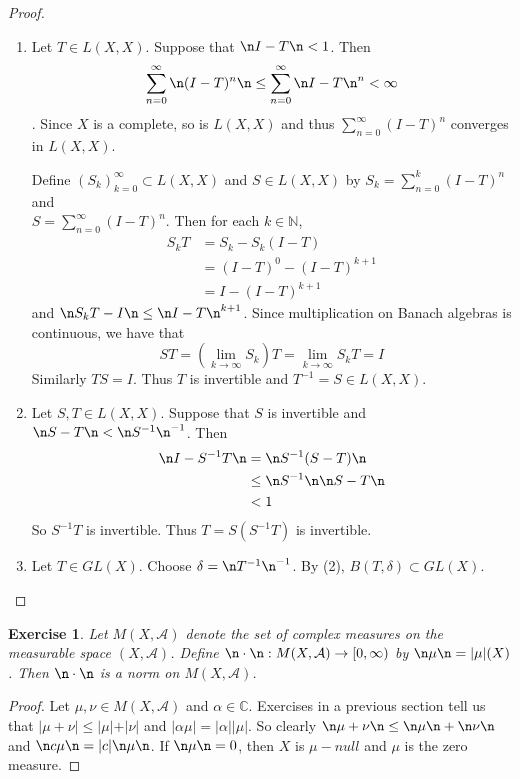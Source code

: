 \documentclass[12pt]{amsart}
\newtheorem{ex}[thm]{Exercise}
\newcommand{\al}{\alpha}
\newcommand{\del}{\delta}
\newcommand{\C}{\mathbb{C}}
\newcommand{\N}{\mathbb{N}}
\newcommand{\MA}{\mathcal{A}}
\newcommand{\Rg}{[0,\infty)}
\begin{document}
\begin{proof}
	\begin{enumerate}
		\item Let $T \in L(X,X)$. Suppose that $\n I-T \n < 1$. Then $$\sum_{n=0}^{\infty} \n (I -T)^n \n  \leq \sum_{n=0}^{\infty} \n I -T \n ^{n} < \infty$$. Since $X$ is a complete, so is $L(X,X)$ and thus $\sum\limits_{n=0}^{\infty}(I-T)^n$ converges in $L(X,X)$.
		
		Define $(S_k)_{k=0}^{\infty} \subset L(X,X)$ and $S \in L(X,X)$ by $S_k = \sum\limits_{n=0}^{k} (I-T)^n$ and \\ $S = \sum\limits_{n=0}^{\infty}(I-T)^n$. Then for each $k \in \N$,
		\begin{align*}
			S_k T
			&= S_k - S_k(I-T) \\
			&= (I-T)^0 - (I-T)^{k+1} \\
			&= I - (I-T)^{k+1}
		\end{align*}
		and $\n S_kT - I \n \leq \n I-T \n ^{k+1}$. Since multiplication on Banach algebras is continuous, we have that $$ST = (\lim_{k \rightarrow \infty} S_k)T = \lim\limits_{k \rightarrow \infty}S_kT = I$$
		Similarly $TS = I$. Thus $T$ is invertible and $T^{-1} = S \in L(X,X)$. \vspace{.5cm}\\
		\item  Let $S, T \in L(X,X)$. Suppose that $S$ is invertible and $\n S-T \n < \n S^{-1} \n ^{-1}$. Then 
		\begin{align*}
			\n I - S^{-1}T \n
			& = \n S^{-1}(S - T) \n \\
			& \leq \n S^{-1} \n \n S -T \n \\
			&< 1
		\end{align*}
		So $S^{-1}T$ is invertible. Thus $T = S (S^{-1}T)$ is invertible. \vspace{.5cm}\\
		\item Let $T \in GL(X)$. Choose $\del = \n T^{-1}\n^{-1}$. By (2), $B(T, \del) \subset GL(X)$.
	\end{enumerate}
\end{proof}

\begin{ex}
	Let $M(X, \MA)$ denote the set of complex measures on the measurable space $(X, \MA)$. Define $\n \cdot \n : M(X, \MA) \rightarrow \Rg$ by $\n \mu \n = \vert \mu \vert (X)$. Then $\n \cdot \n$ is a norm on $M(X, \MA)$. 
\end{ex}

\begin{proof}
	Let $\mu, \nu \in M(X, \MA)$ and $\al \in \C$. Exercises in a previous section tell us that $\vert \mu + \nu \vert \leq \vert \mu \vert + \vert \nu \vert$ and $\vert \al \mu \vert = \vert \al \vert \vert \mu \vert$. So clearly $\n \mu + \nu \n \leq \n \mu \n + \n \nu \n$ and $\n c \mu \n = \vert c \vert \n \mu \n $. If $\n \mu \n = 0$, then $X$ is $\mu-null$ and $\mu$ is the zero measure.
\end{proof}
\end{document}
